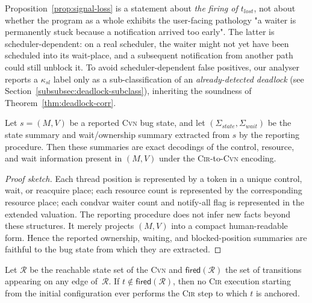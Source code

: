 \begin{remark}
\label{rem:signal-loss-scope}
Proposition~\ref{prop:signal-loss} is a statement about
\emph{the firing of $t_{\mathit{lost}}$}, not about whether the
program as a whole exhibits the user-facing pathology "a waiter is
permanently stuck because a notification arrived too early". The
latter is scheduler-dependent: on a real scheduler, the waiter might
not yet have been scheduled into its wait-place, and a subsequent
notification from another path could still unblock it. To avoid
scheduler-dependent false positives, our analyser reports a
$\kappa_{sl}$ label only as a sub-classification of an
\emph{already-detected deadlock} (see Section~\ref{subsubsec:deadlock-subclass}), inheriting the soundness of Theorem~\ref{thm:deadlock-corr}.
\end{remark}

\begin{proposition}
\label{prop:diagnostic}
Let $s = (M, V)$ be a reported \textsc{Cvn} bug state, and let
$(\Sigma_{\mathit{state}}, \Sigma_{\mathit{wait}})$ be the
state summary and wait/ownership summary extracted from $s$ by
the reporting procedure. Then these summaries are exact
decodings of the control, resource, and wait information present
in $(M, V)$ under the \textsc{Cir}-to-\textsc{Cvn} encoding.
\end{proposition}

\begin{proof}[Proof sketch]
Each thread position is represented by a token in a unique
control, wait, or reacquire place; each resource count is
represented by the corresponding resource place; each condvar
waiter count and notify-all flag is represented in the extended
valuation. The reporting procedure does not infer new facts
beyond these structures. It merely projects $(M, V)$ into a
compact human-readable form. Hence the reported ownership,
waiting, and blocked-position summaries are faithful to the bug
state from which they are extracted.
\end{proof}

\begin{proposition}
\label{prop:dead-transition}
Let $\mathcal{R}$ be the reachable state set of the \textsc{Cvn} and
$\mathsf{fired}(\mathcal{R})$ the set of transitions appearing on any
edge of~$\mathcal{R}$. If $t\notin\mathsf{fired}(\mathcal{R})$, then no
\textsc{Cir} execution starting from the initial configuration ever
performs the \textsc{Cir} step to which $t$ is anchored.
\end{proposition}

